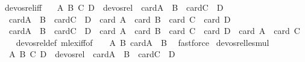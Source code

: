 \begin{isabellebody}
\isanewline
{}\isamarkupfalse%
\ devos{\isacharunderscore}{\kern0pt}rel{\isacharunderscore}{\kern0pt}iff{\isacharcolon}{\kern0pt}\ \isanewline
\ \ {\isachardoublequoteopen}{\isacharparenleft}{\kern0pt}{\isacharparenleft}{\kern0pt}A{\isacharcomma}{\kern0pt}\ B{\isacharparenright}{\kern0pt}{\isacharcomma}{\kern0pt}\ {\isacharparenleft}{\kern0pt}C{\isacharcomma}{\kern0pt}\ D{\isacharparenright}{\kern0pt}{\isacharparenright}{\kern0pt}\ {\isasymin}\ devos{\isacharunderscore}{\kern0pt}rel\ {\isasymlongleftrightarrow}\ card{\isacharparenleft}{\kern0pt}A\ {\isasymcdots}\ B{\isacharparenright}{\kern0pt}\ {\isacharless}{\kern0pt}\ card{\isacharparenleft}{\kern0pt}C\ {\isasymcdots}\ D{\isacharparenright}{\kern0pt}\ {\isasymor}\ \isanewline
\ \ {\isacharparenleft}{\kern0pt}card{\isacharparenleft}{\kern0pt}A\ {\isasymcdots}\ B{\isacharparenright}{\kern0pt}\ {\isacharequal}{\kern0pt}\ card{\isacharparenleft}{\kern0pt}C\ {\isasymcdots}\ D{\isacharparenright}{\kern0pt}\ {\isasymand}\ card\ A\ {\isacharplus}{\kern0pt}\ card\ B\ {\isachargreater}{\kern0pt}\ card\ C\ {\isacharplus}{\kern0pt}\ card\ D{\isacharparenright}{\kern0pt}\ {\isasymor}\isanewline
\ \ {\isacharparenleft}{\kern0pt}card{\isacharparenleft}{\kern0pt}A\ {\isasymcdots}\ B{\isacharparenright}{\kern0pt}\ {\isacharequal}{\kern0pt}\ card{\isacharparenleft}{\kern0pt}C\ {\isasymcdots}\ D{\isacharparenright}{\kern0pt}\ {\isasymand}\ card\ A\ {\isacharplus}{\kern0pt}\ card\ B\ {\isacharequal}{\kern0pt}\ card\ C\ {\isacharplus}{\kern0pt}\ card\ D\ {\isasymand}\ card\ A\ {\isacharless}{\kern0pt}\ card\ C{\isacharparenright}{\kern0pt}{\isachardoublequoteclose}\isanewline
%
\isadelimproof
\ \ %
\endisadelimproof
%
\isatagproof
{}\isamarkupfalse%
\ devos{\isacharunderscore}{\kern0pt}rel{\isacharunderscore}{\kern0pt}def\ mlex{\isacharunderscore}{\kern0pt}iff{\isacharbrackleft}{\kern0pt}of\ {\isacharunderscore}{\kern0pt}\ {\isacharunderscore}{\kern0pt}\ {\isachardoublequoteopen}{\isasymlambda}\ {\isacharparenleft}{\kern0pt}A{\isacharcomma}{\kern0pt}\ B{\isacharparenright}{\kern0pt}{\isachardot}{\kern0pt}\ card{\isacharparenleft}{\kern0pt}A\ {\isasymcdots}\ B{\isacharparenright}{\kern0pt}{\isachardoublequoteclose}{\isacharbrackright}{\kern0pt}\ \isamarkupfalse%
\ fastforce%
\endisatagproof
{\isafoldproof}%
%
\isadelimproof
\isanewline
%
\endisadelimproof
\isanewline
{}\isamarkupfalse%
\ devos{\isacharunderscore}{\kern0pt}rel{\isacharunderscore}{\kern0pt}le{\isacharunderscore}{\kern0pt}smul{\isacharcolon}{\kern0pt}\isanewline
\ \ {\isachardoublequoteopen}{\isacharparenleft}{\kern0pt}{\isacharparenleft}{\kern0pt}A{\isacharcomma}{\kern0pt}\ B{\isacharparenright}{\kern0pt}{\isacharcomma}{\kern0pt}\ {\isacharparenleft}{\kern0pt}C{\isacharcomma}{\kern0pt}\ D{\isacharparenright}{\kern0pt}{\isacharparenright}{\kern0pt}\ {\isasymin}\ devos{\isacharunderscore}{\kern0pt}rel\ {\isasymLongrightarrow}\ card{\isacharparenleft}{\kern0pt}A\ {\isasymcdots}\ B{\isacharparenright}{\kern0pt}\ {\isasymle}\ card{\isacharparenleft}{\kern0pt}C\ {\isasymcdots}\ D{\isacharparenright}{\kern0pt}{\isachardoublequoteclose}\isanewline

\end{isabellebody}
